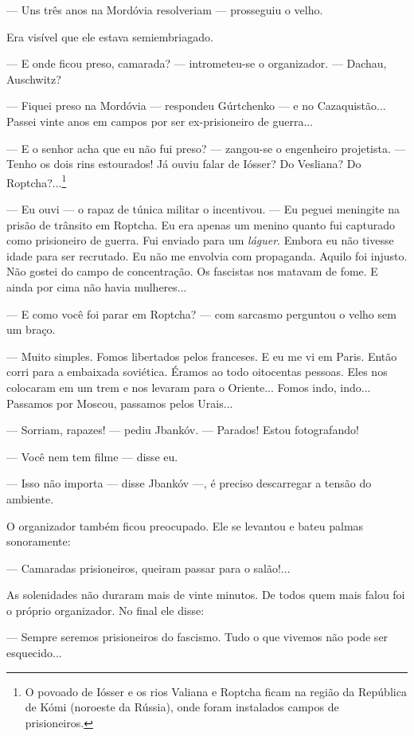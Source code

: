 --- Uns três anos na Mordóvia resolveriam --- prosseguiu o velho.

Era visível que ele estava semiembriagado.

--- E onde ficou preso, camarada? --- intrometeu-se o organizador. ---
Dachau, Auschwitz?

--- Fiquei preso na Mordóvia --- respondeu Gúrtchenko --- e no
Cazaquistão... Passei vinte anos em campos por ser ex-prisioneiro de
guerra...

--- E o senhor acha que eu não fui preso? --- zangou-se o engenheiro
projetista. --- Tenho os dois rins estourados! Já ouviu falar de Iósser?
Do Vesliana? Do Roptcha?...\footnote{O povoado de Iósser e os rios
  Valiana e Roptcha ficam na região da República de Kómi (noroeste da
  Rússia), onde foram instalados campos de prisioneiros.}

--- Eu ouvi --- o rapaz de túnica militar o incentivou. --- Eu peguei
meningite na prisão de trânsito em Roptcha. Eu era apenas um menino
quanto fui capturado como prisioneiro de guerra. Fui enviado para um
\emph{láguer}. Embora eu não tivesse idade para ser recrutado. Eu não me
envolvia com propaganda. Aquilo foi injusto. Não gostei do campo de
concentração. Os fascistas nos matavam de fome. E ainda por cima não
havia mulheres...

--- E como você foi parar em Roptcha? --- com sarcasmo perguntou o velho
sem um braço.

--- Muito simples. Fomos libertados pelos franceses. E eu me vi em
Paris. Então corri para a embaixada soviética. Éramos ao todo oitocentas
pessoas. Eles nos colocaram em um trem e nos levaram para o Oriente...
Fomos indo, indo... Passamos por Moscou, passamos pelos Urais...

--- Sorriam, rapazes! --- pediu Jbankóv. --- Parados! Estou
fotografando!

--- Você nem tem filme --- disse eu.

--- Isso não importa --- disse Jbankóv ---, é preciso descarregar a
tensão do ambiente.

O organizador também ficou preocupado. Ele se levantou e bateu palmas
sonoramente:

--- Camaradas prisioneiros, queiram passar para o salão!...

As solenidades não duraram mais de vinte minutos. De todos quem mais
falou foi o próprio organizador. No final ele disse:

--- Sempre seremos prisioneiros do fascismo. Tudo o que vivemos não pode
ser esquecido...

